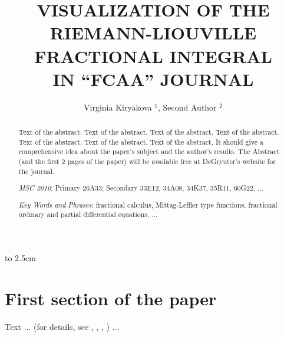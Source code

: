 \documentclass[twoside,reqno,11pt]{fcaa-var} %
\title[VISUALIZATION OF FRACTIONAL INTEGRALS]{VISUALIZATION OF THE RIEMANN-LIOUVILLE FRACTIONAL INTEGRAL \\ [3pt] IN ``FCAA'' JOURNAL}
\author[\normalsize V. Kiryakova, S. Author]{\normalsize Virginia Kiryakova $^1$, Second Author $^2$}
\begin{document}
 \vbox to 2.5cm { \vfill }


 \bigskip \medskip

 \begin{abstract}

Text of the abstract. Text of the abstract. Text of the abstract.
Text of the abstract. Text of the abstract. Text of the abstract.
Text of the abstract. It should give a comprehensive idea about the
paper's subject and the author's results. The Abstract (and the first 2 pages of the paper) will be
available free at DeGryuter's website for the journal.

 \medskip

{\it MSC 2010\/}: Primary 26A33;
                  Secondary 33E12, 34A08, 34K37, 35R11, 60G22, ...

 \smallskip

{\it Key Words and Phrases}: fractional calculus, Mittag-Leffler
type functions, fractional ordinary and partial differential
equations, ...

 \end{abstract}

 \maketitle

 \vspace*{-16pt}



\section{First section of the paper}\label{sec:1}

\setcounter{section}{1}
\setcounter{equation}{0}\setcounter{theorem}{0}


Text ... (for details, see \cite{GasRah}, \cite{Rosbl}, \cite{Kir},
\cite{Moak}) ...
\end{document}
